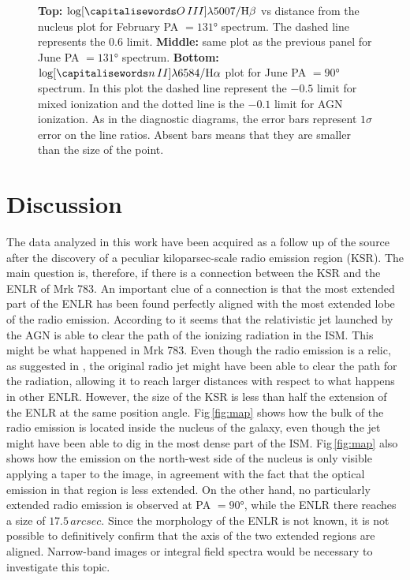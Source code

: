 \documentclass[../main.tex]{subfiles}
\begin{document}
\begin{figure}
\caption[]{\textbf{Top:} $\log [\ion{O}{III}]\lambda5007/\Hb$ vs distance from the nucleus plot for February PA $=\ang{131}$ spectrum. The dashed line represents the $0.6$ limit.
\textbf{Middle:} same plot as the previous panel for June PA $=\ang{131}$ spectrum.
\textbf{Bottom:} $\log [\ion{n}{II}]\lambda6584/\Ha$ plot for June PA $=\ang{90}$ spectrum. In this plot the dashed line represent the $-0.5$ limit for mixed ionization and the dotted line is the $-0.1$ limit for AGN ionization. As in the diagnostic diagrams, the error bars represent $1\sigma$ error on the line ratios. Absent bars means that they are smaller than the size of the point.}
\label{fig:o3hb_ratio}
\end{figure} 


\section{Discussion}
\label{sec:pap3_discussion}

The data analyzed in this work have been acquired as a follow up of the source after the discovery of a peculiar kiloparsec-scale radio emission region (KSR).
The main question is, therefore, if there is a connection between the KSR and the ENLR of Mrk 783.
An important clue of a connection is that the most extended part of the ENLR has been found perfectly aligned with the most extended lobe of the radio emission.
According to \citet{Wilson94} it seems that the relativistic jet launched by the AGN is able to clear the path of the ionizing radiation in the ISM.
This might be what happened in Mrk 783.
Even though the radio emission is a relic, as suggested in \citep{Congiu17}, the original radio jet might have been able to clear the path for the radiation, allowing it to reach larger distances with respect to what happens in other ENLR.
However, the size of the KSR is less than half the extension of the ENLR at the same position angle.
Fig\,\ref{fig:map} shows how the bulk of the radio emission is located inside the nucleus of the galaxy, even though the jet might have been able to dig in the most dense part of the ISM.
Fig\,\ref{fig:map} also shows how the emission on the north-west side of the nucleus is only visible applying a taper to the image, in agreement with the fact that the optical emission in that region is less extended.
On the other hand, no particularly extended radio emission is observed at PA $=\ang{90}$, while the ENLR there reaches a size of $17.5\,\si{arcsec}$.
Since the morphology of the ENLR is not known, it is not possible to definitively confirm that the axis of the two extended regions are aligned.
Narrow-band images or integral field spectra would be necessary to investigate this topic.
\end{document}
